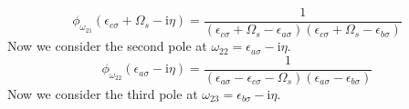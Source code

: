 \documentclass[12pt]{article}
\begin{document}
\begin{equation}
\boxed{\phi_{\omega_{21}}(\epsilon_{c \sigma} + \Omega_s - \mathrm{i} \eta) = \frac{1}{(\epsilon_{c \sigma} + \Omega_s -\epsilon_{a \sigma})(\epsilon_{c \sigma} + \Omega_s -\epsilon_{b \sigma})}}
\end{equation}
Now we consider the second pole at $\omega_{22} = \epsilon _{a\sigma } - \mathrm{i} \eta$.
\begin{equation}
\boxed{\phi_{\omega_{22}}(\epsilon_{a \sigma} - \mathrm{i} \eta) = \frac{1}{(\epsilon_{a \sigma} -\epsilon_{c \sigma}-\Omega_s)(\epsilon_{a \sigma} -\epsilon_{b \sigma})}}
\end{equation}
Now we consider the third pole at $\omega_{23} = \epsilon _{b\sigma } - \mathrm{i} \eta$.
\end{document}
